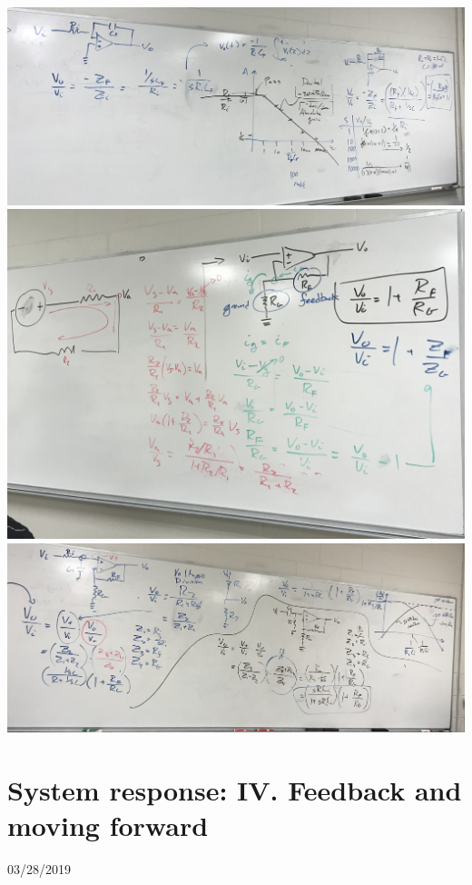 \documentclass[11pt]{book}
\begin{document}
\\
\includegraphics[width=\textwidth]{figures/3-14-19_Fig.4.jpg}
\\
\includegraphics[width=\textwidth]{figures/3-14-19_Fig.5.jpg}
\\
\includegraphics[width=\textwidth]{figures/3-14-19_Fig.6.jpg}


\chapter{System response: IV. Feedback and moving forward}
03/28/2019
\minitoc
\newpage
\end{document}
